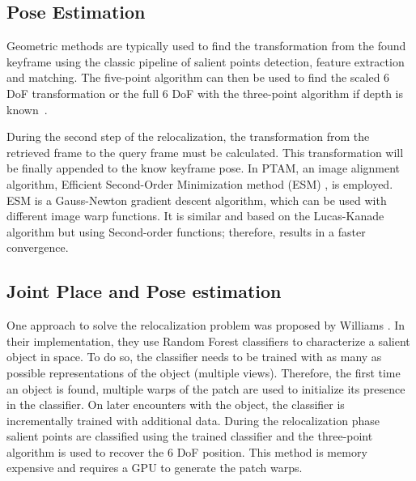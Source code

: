 \subsection{Pose Estimation}
\label{ssub:pose_estimation}

Geometric methods are typically used to find the transformation from the found keyframe using the classic pipeline of salient points detection, feature extraction and matching. The five-point algorithm can then be used to find the scaled 6 DoF transformation or the full 6 DoF with the three-point algorithm if depth is known~\cite{hartley2003multiple}.

During the second step of the relocalization, the transformation from the retrieved frame to the query frame must be calculated. This transformation will be finally appended to the know keyframe pose. In PTAM, an image alignment algorithm, Efficient Second-Order Minimization method (ESM) \cite{Benhimane2006}, is employed. ESM is a Gauss-Newton gradient descent algorithm, which can be used with different image warp functions. It is similar and based on the  Lucas-Kanade \cite{Baker2004} algorithm but using Second-order functions; therefore, results in a faster convergence.\\

\subsection{Joint Place and Pose estimation}
\label{ssub:joint_place_and_pose_estimaton}

One approach to solve the relocalization problem was proposed by Williams \cite{Williams2007}. In their implementation, they use Random Forest classifiers to characterize a salient object in space. To do so, the classifier needs to be trained with as many as possible representations of the object (multiple views). Therefore, the first time an object is found, multiple warps of the patch are used to initialize its presence in the classifier. On later encounters with the object, the classifier is incrementally trained with additional data. During the relocalization phase salient points are classified using the trained classifier and the three-point algorithm is used to recover the 6 DoF position. This method is memory expensive and requires a GPU to generate the patch warps.\\

